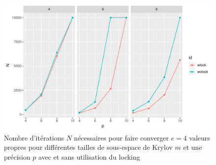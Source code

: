 \documentclass[11pt,a4paper]{article}
\begin{document}
\begin{figure}
	\centering
	\includegraphics[width=0.8\linewidth, keepaspectratio]{plots/Nvsp_complock.pdf}
	\caption{Nombre d'itérations $N$ nécessaires pour faire converger $e = 4$ valeurs propres pour différentes tailles de sous-espace de Krylov $m$ et une précision $p$ avec et sans utilisation du locking \label{fig:Nvsp_complock}}
\end{figure}
\end{document}
